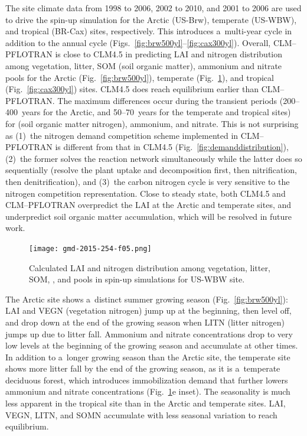 \documentclass[gmd,noline]{copernicus}
\begin{document}
      The site climate data from 1998 to 2006, 2002 to 2010, and 2001 to
      2006 are used to drive the spin-up simulation for the Arctic (US-Brw),
      temperate (US-WBW), and tropical (BR-Cax) sites, respectively. This
      introduces a~multi-year cycle in addition to the annual cycle
      (Figs.~\ref{fig:brw500yl}--\ref{fig:cax300yl}). Overall, CLM--PFLOTRAN
      is close to CLM4.5 in predicting LAI and nitrogen distribution among
      vegetation, litter, SOM (soil organic matter), ammonium and nitrate
      pools for the Arctic (Fig.~\ref{fig:brw500yl}), temperate
      (Fig.~\ref{fig:pit300yl}), and tropical (Fig.~\ref{fig:cax300yl})
      sites. CLM4.5 does reach equilibrium earlier than CLM--PFLOTRAN. The
      maximum differences occur during the transient periods (200--400~years
      for the Arctic, and 50--70~years for the temperate and tropical
      sites) for  (soil organic matter nitrogen), ammonium, and
      nitrate. This is not surprising as (1)~the nitrogen demand competition
      scheme implemented in CLM--PFLOTRAN is different from that in CLM4.5
      (Fig.~\ref{fig:demanddistribution}), (2)~the former solves the
      reaction network simultaneously while the latter does so sequentially
      (resolve the plant uptake and decomposition first, then nitrification,
      then denitrification), and (3)~the carbon nitrogen cycle is very
      sensitive to the nitrogen competition representation. Close to steady
      state, both CLM4.5 and CLM--PFLOTRAN overpredict the LAI at the Arctic
      and temperate sites, and underpredict soil organic matter
      accumulation, which will be resolved in future work.

\begin{figure}[t]
\texttt{[image: gmd-2015-254-f05.png]}
\caption{Calculated LAI and nitrogen distribution among vegetation, litter,
SOM, , and  pools in spin-up simulations for US-WBW
site.} \label{fig:pit300yl}
\end{figure}


      The Arctic site shows a~distinct summer growing season
      (Fig.~\ref{fig:brw500yl}): LAI and VEGN (vegetation nitrogen) jump up
      at the beginning, then level off, and drop down at the end of the
      growing season when LITN (litter nitrogen) jumps up due to litter
      fall.  Ammonium and nitrate concentrations drop to very low levels at
      the beginning of the growing season and accumulate at other times. In
      addition to a~longer growing season than the Arctic site, the
      temperate site shows more litter fall by the end of the growing
      season, as it is a~temperate deciduous forest, which introduces
      immobilization demand that further lowers ammonium and nitrate
      concentrations (Fig.~\ref{fig:pit300yl}e inset). The seasonality is
      much less apparent in the tropical site than in the Arctic and
      temperate sites. LAI, VEGN, LITN, and SOMN accumulate with less
      seasonal variation to reach equilibrium.
\end{document}
